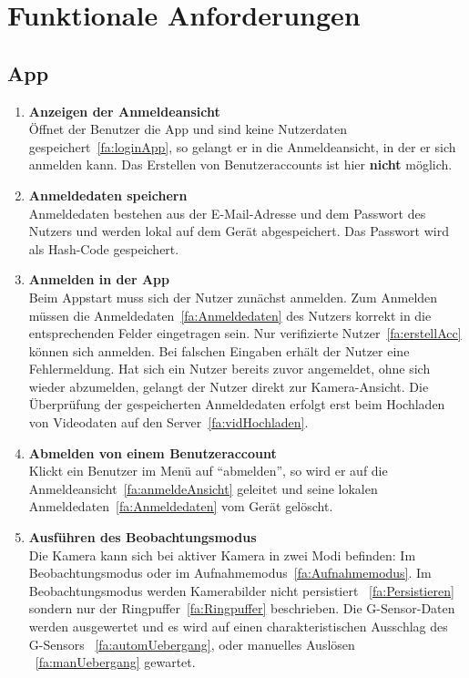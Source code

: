 \chapter{Funktionale Anforderungen}

\section{\gls{App}}
\begin{enumerate}
\renewcommand{\labelenumi}{\textbf{\theenumi}}
\renewcommand{\theenumi}{FA\arabic{enumi}0}
\setcounter{enumi}{99}
\item \label{fa:anmeldeAnsicht} \textbf{Anzeigen der Anmeldeansicht} \hfill \\
Öffnet der Benutzer die \gls{App} und sind keine Nutzerdaten gespeichert~\eqref{fa:loginApp}, so gelangt er in die Anmeldeansicht, in der er sich anmelden kann. Das Erstellen von Benutzeraccounts ist hier \textbf{nicht} möglich.

\item \label{fa:Anmeldedaten}\textbf{Anmeldedaten speichern} \hfill \\
Anmeldedaten bestehen aus der E-Mail-Adresse und dem Passwort des Nutzers und werden lokal auf dem Gerät abgespeichert. Das Passwort wird als \gls{Hash-Code} gespeichert.

\item \label{fa:loginApp} \textbf{Anmelden in der \gls{App}} \hfill \\
Beim Appstart muss sich der Nutzer zunächst anmelden. Zum Anmelden müssen die Anmeldedaten~\eqref{fa:Anmeldedaten} des Nutzers korrekt in die entsprechenden Felder eingetragen sein. Nur verifizierte Nutzer~\eqref{fa:erstellAcc} können sich anmelden. Bei falschen Eingaben erhält der Nutzer eine Fehlermeldung. Hat sich ein Nutzer bereits zuvor angemeldet, ohne sich wieder abzumelden, gelangt der Nutzer direkt zur Kamera-Ansicht. Die Überprüfung der gespeicherten Anmeldedaten erfolgt erst beim Hochladen von Videodaten auf den Server~\eqref{fa:vidHochladen}.

\item \label{fa:logOut}\textbf{Abmelden von einem Benutzeraccount} \hfill \\
Klickt ein Benutzer im Menü auf ``abmelden'', so wird er auf die Anmeldeansicht~\eqref{fa:anmeldeAnsicht} geleitet und seine lokalen Anmeldedaten~\eqref{fa:Anmeldedaten} vom Gerät gelöscht.

\item \label{fa:Beobachtungsmodus}\textbf{Ausführen des Beobachtungsmodus} \hfill \\
Die Kamera kann sich bei aktiver Kamera in zwei Modi befinden: Im Beobachtungsmodus oder im Aufnahmemodus~\eqref{fa:Aufnahmemodus}.
Im Beobachtungsmodus werden Kamerabilder nicht persistiert ~\eqref{fa:Persistieren} sondern nur der \gls{Ringpuffer}~\eqref{fa:Ringpuffer} beschrieben. Die \gls{G-Sensor}-Daten werden ausgewertet und es wird auf einen charakteristischen Ausschlag des G-Sensors ~\eqref{fa:automUebergang}, oder manuelles Auslösen ~\eqref{fa:manUebergang} gewartet.


\end{enumerate}
